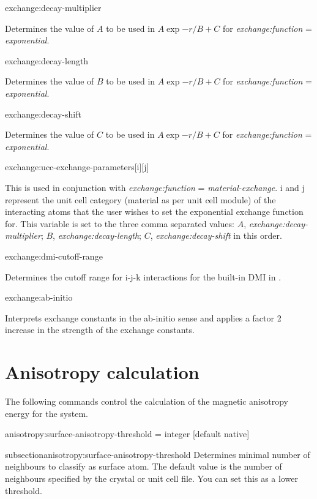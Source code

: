 {\zicf exchange:decay-multiplier}
Determines the value of $A$ to be used in $A\exp{-r/B}+C$ for
\textit{exchange:function} = \textit{exponential}.

{\zicf exchange:decay-length}
Determines the value of $B$ to be used in $A\exp{-r/B}+C$ for
\textit{exchange:function} = \textit{exponential}.

{\zicf exchange:decay-shift}
Determines the value of $C$ to be used in $A\exp{-r/B}+C$ for
\textit{exchange:function} = \textit{exponential}.

{\zicf exchange:ucc-exchange-parameters[i][j]}
This is used in conjunction with \textit{exchange:function} =
\textit{material-exchange}. i and j represent the unit cell category (material
as per unit cell module) of the interacting atoms that the user wishes to set
the exponential exchange function for. This variable is set to the three comma
separated values: $A$, \textit{exchange:decay-multiplier}; $B$,
\textit{exchange:decay-length}; $C$, \textit{exchange:decay-shift} in this order.

{\zicf exchange:dmi-cutoff-range}
Determines the cutoff range for i-j-k interactions for the built-in DMI in \vampire.

{\zicf exchange:ab-initio}
Interprets exchange constants in the ab-initio sense and applies a factor 2 increase
in the strength of the exchange constants.\\

\section*{Anisotropy calculation}
The following commands control the calculation of the magnetic anisotropy energy
for the system.

{\zicf anisotropy:surface-anisotropy-threshold = integer [default native]}
{subsection}{anisotropy:surface-anisotropy-threshold} Determines minimal number
of neighbours to classify as surface atom. The default value is the number of
neighbours specified by the crystal or unit cell file. You can set this as a
lower threshold.

